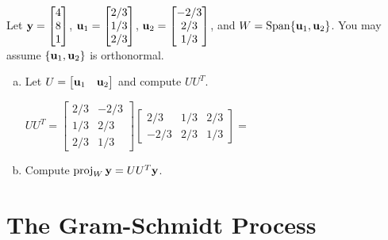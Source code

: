 \begin{exercise} %
	Let $\boldsymbol{\mathbf{y}}=\begin{bmatrix}4\\8\\1\end{bmatrix}$, $\boldsymbol{\mathbf{u}}_1=\begin{bmatrix}2/3\\1/3\\2/3\end{bmatrix}$, $\boldsymbol{\mathbf{u}}_2=\begin{bmatrix}-2/3\\2/3\\1/3\end{bmatrix}$, and $W=\operatorname{Span}\{\boldsymbol{\mathbf{u}}_1,\boldsymbol{\mathbf{u}}_2\}$. You may assume $\{\boldsymbol{\mathbf{u}}_1,\boldsymbol{\mathbf{u}}_2\}$ is orthonormal.
	\begin{enumerate}[(a)]
		\item Let $U=\begin{bmatrix}\boldsymbol{\mathbf{u}}_1&\boldsymbol{\mathbf{u}}_2\end{bmatrix}$ and compute $UU^T$.
		
		$UU^T = \begin{bmatrix}2/3&-2/3\\1/3&2/3\\2/3&1/3\end{bmatrix}
		\begin{bmatrix}2/3&1/3&2/3\\-2/3&2/3&1/3\end{bmatrix}=$
		\vspace{2em}
		\item Compute $\operatorname{proj}_W\boldsymbol{\mathbf{y}}=UU^T\boldsymbol{\mathbf{y}}$.
		\vspace{1in}
	\end{enumerate}
\end{exercise}


\newpage


\section{The Gram-Schmidt Process}
\name

